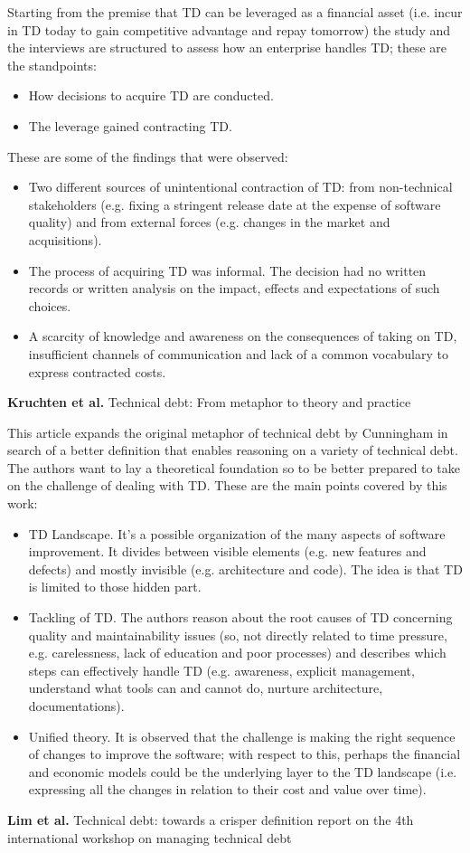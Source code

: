 Starting from the premise that TD can be leveraged as a financial asset (i.e. incur in TD today to gain competitive advantage and repay tomorrow) the study and the interviews are structured to assess how an enterprise handles TD; these are the standpoints:
\begin{itemize}
    \item How decisions to acquire TD are conducted.
    \item The leverage gained contracting TD.
\end{itemize}
These are some of the findings that were observed:
\begin{itemize}
    \item Two different sources of unintentional contraction of TD: from non-technical stakeholders (e.g. fixing a stringent release date at the expense of software quality) and from external forces (e.g. changes in the market and acquisitions).
    \item The process of acquiring TD was informal. The decision had no written records or written analysis on the impact, effects and expectations of such choices.
    \item A scarcity of knowledge and awareness on the consequences of taking on TD, insufficient channels of communication and lack of a common vocabulary to express contracted costs. 
\end{itemize}
\textbf{Kruchten et al.} \cite{kruchten2012technical} Technical debt: From metaphor to theory and practice

This article expands the original metaphor of technical debt by Cunningham \cite{cunningham1992wycash} in search of a better definition that enables reasoning on a variety of technical debt.
The authors want to lay a theoretical foundation so to be better prepared to take on the challenge of dealing with TD. These are the main points covered by this work:
\begin{itemize}
    \item TD Landscape. It's a possible organization of the many aspects of software improvement. It divides between visible elements (e.g. new features and defects) and mostly invisible (e.g. architecture and code). The idea is that TD is limited to those hidden part. 
    \item Tackling of TD. The authors reason about the root causes of TD concerning quality and maintainability issues (so, not directly related to time pressure, e.g. carelessness, lack of education and poor processes) and describes which steps can effectively handle TD (e.g. awareness, explicit management, understand what tools can and cannot do, nurture architecture, documentations).
    \item Unified theory. It is observed that the challenge is making the right sequence of changes to improve the software; with respect to this, perhaps the financial and economic models could be the underlying layer to the TD landscape (i.e. expressing all the changes in relation to their cost and value over time).
\end{itemize}
\textbf{Lim et al.} \cite{lim2012balancing} Technical debt: towards a crisper definition report on the 4th international workshop on managing technical debt
 
